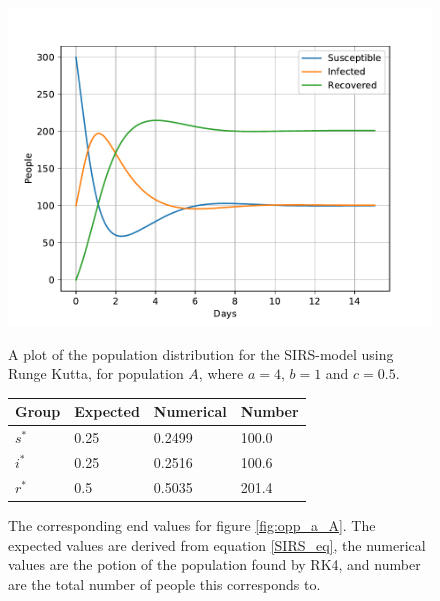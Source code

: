 \documentclass[a4paper]{article}
\begin{document}
	\begin{figure}[!htb]
		\centering
		\begin{minipage}{0.49\textwidth}
			\centering
			\includegraphics[scale=0.6]{../plots/opp_a_A.pdf}
			\caption{A plot of the population distribution for the SIRS-model using Runge Kutta, for population $A$, where $a=4$, $b=1$ and $c=0.5$. }\label{fig:opp_a_A}
		\end{minipage}
		\begin{minipage}{0.49\textwidth}
			\centering
			\captionsetup{type=table} %
			\begin{tabular}{|l|l|l|l|}
				\hline
				Group & Expected & Numerical   & Number  \\ \hline
				$s^*$ & 0.25 & 0.2499 & 100.0 \\ \hline
				$i^*$ & 0.25 & 0.2516 & 100.6 \\ \hline
				$r^*$ & 0.5  & 0.5035 & 201.4 \\ \hline
			\end{tabular}
			\caption{The corresponding end values for figure \ref{fig:opp_a_A}. The expected values are derived from equation \ref{SIRS_eq}, the numerical values are the potion of the population found by RK4, and number are the total number  of people this corresponds to.}\label{tab:opp_a_A}
		\end{minipage}
	\end{figure}
	
\end{document}
